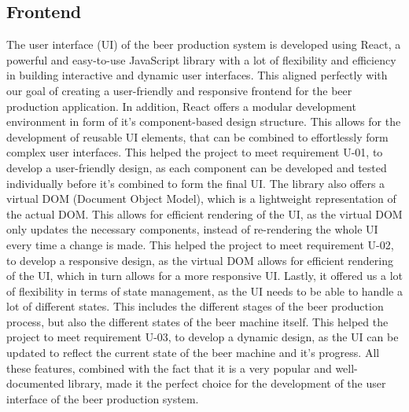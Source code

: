 \subsection{Frontend}
The user interface (UI) of the beer production system is developed using React, a powerful and easy-to-use JavaScript library with a lot of flexibility and efficiency in building interactive and dynamic user interfaces. This aligned perfectly with our goal of creating a user-friendly and responsive frontend for the beer production application.
In addition, React offers a modular development environment in form of it's component-based design structure. This allows for the development of reusable UI elements, that can be combined to effortlessly form complex user interfaces. This helped the project to meet requirement U-01, to develop a user-friendly design, as each component can be developed and tested individually before it's combined to form the final UI. \newline
The library also offers a virtual DOM (Document Object Model), which is a lightweight representation of the actual DOM. This allows for efficient rendering of the UI, as the virtual DOM only updates the necessary components, instead of re-rendering the whole UI every time a change is made. This helped the project to meet requirement U-02, to develop a responsive design, as the virtual DOM allows for efficient rendering of the UI, which in turn allows for a more responsive UI. \newline
Lastly, it offered us a lot of flexibility in terms of state management, as the UI needs to be able to handle a lot of different states. This includes the different stages of the beer production process, but also the different states of the beer machine itself. This helped the project to meet requirement U-03, to develop a dynamic design, as the UI can be updated to reflect the current state of the beer machine and it's progress. \cite{8} \newline
All these features, combined with the fact that it is a very popular and well-documented library, made it the perfect choice for the development of the user interface of the beer production system.
